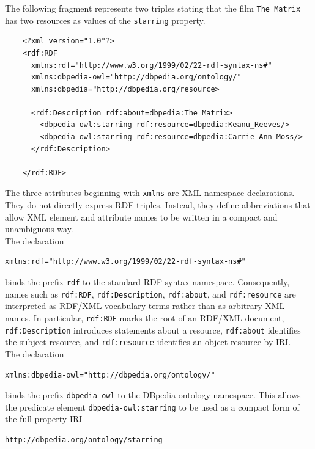 \documentclass{scrbook}
\begin{document}
	The following fragment represents two triples stating that the film \texttt{The\_Matrix} has two resources as values of the \texttt{starring} property.
	
	\begin{lstlisting}
	<?xml version="1.0"?>
	<rdf:RDF
	  xmlns:rdf="http://www.w3.org/1999/02/22-rdf-syntax-ns#"
	  xmlns:dbpedia-owl="http://dbpedia.org/ontology/"
	  xmlns:dbpedia="http://dbpedia.org/resource>
	
	  <rdf:Description rdf:about=dbpedia:The_Matrix>
	    <dbpedia-owl:starring rdf:resource=dbpedia:Keanu_Reeves/>
	    <dbpedia-owl:starring rdf:resource=dbpedia:Carrie-Ann_Moss/>
	  </rdf:Description>
		
	</rdf:RDF>
	\end{lstlisting}
	
	The three attributes beginning with \texttt{xmlns} are XML namespace declarations. They do not directly express RDF triples. Instead, they define abbreviations that allow XML element and attribute names to be written in a compact and unambiguous way.\\
	
	The declaration
	
	\begin{lstlisting}
xmlns:rdf="http://www.w3.org/1999/02/22-rdf-syntax-ns#"
	\end{lstlisting}
	
	binds the prefix \texttt{rdf} to the standard RDF syntax namespace. Consequently, names such as \texttt{rdf:RDF}, \texttt{rdf:Description}, \texttt{rdf:about}, and \texttt{rdf:resource} are interpreted as RDF/XML vocabulary terms rather than as arbitrary XML names. In particular, \texttt{rdf:RDF} marks the root of an RDF/XML document, \texttt{rdf:Description} introduces statements about a resource, \texttt{rdf:about} identifies the subject resource, and \texttt{rdf:resource} identifies an object resource by IRI.\\
	
	The declaration
	
	\begin{lstlisting}
xmlns:dbpedia-owl="http://dbpedia.org/ontology/"
	\end{lstlisting}
	
	binds the prefix \texttt{dbpedia-owl} to the DBpedia ontology namespace. This allows the predicate element \texttt{dbpedia-owl:starring} to be used as a compact form of the full property IRI
	
	\begin{lstlisting}
http://dbpedia.org/ontology/starring
	\end{lstlisting}
	
\end{document}
